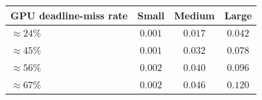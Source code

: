 \begin{tabular}{lccc}
\toprule
GPU deadline-miss rate & Small & Medium & Large \\
\midrule
$\approx24\%$ & $0.001$ & $0.017$ & $0.042$ \\
$\approx45\%$ & $0.001$ & $0.032$ & $0.078$ \\
$\approx56\%$ & $0.002$ & $0.040$ & $0.096$ \\
$\approx67\%$ & $0.002$ & $0.046$ & $0.120$ \\
\bottomrule
\end{tabular}
